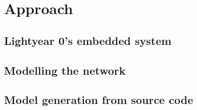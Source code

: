 \section{Approach}
\label{sec:approach}

\subsection{Lightyear 0's embedded system}


\subsection{Modelling the network}


\subsection{Model generation from source code}

